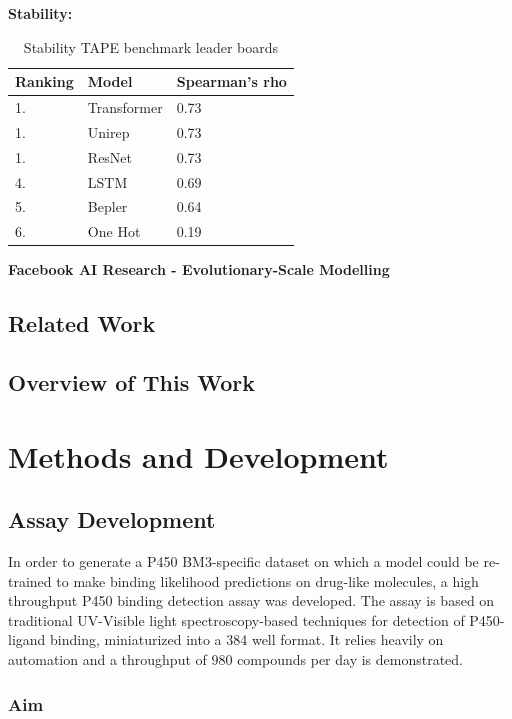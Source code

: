 \documentclass{article}
\begin{document}
\textbf{Stability:}

\begin{table}
	\begin{center}
		\caption{\label{tapestab} Stability TAPE benchmark leader boards }
		\begin{tabular}{l|p{3cm}|l}
			\textbf{Ranking} & \textbf{Model} & \textbf{Spearman's rho}\\
		\hline 
			 1. & Transformer & 0.73 \\
			 1. & Unirep & 0.73 \\
			 1. & ResNet & 0.73 \\
			 4. & LSTM & 0.69 \\
			 5. & Bepler & 0.64 \\
			 6. & One Hot & 0.19 \\
		\end{tabular}
	\end{center}
\end{table}

\textbf{Facebook AI Research - Evolutionary-Scale Modelling}
\subsection{Related Work}
\subsection{Overview of This Work}
\section{Methods and Development}
\subsection{Assay Development}

In order to generate a P450 BM3-specific dataset on which a model could be re-trained to make binding likelihood predictions on drug-like molecules, a high throughput P450 binding detection assay was developed.
The assay is based on traditional UV-Visible light spectroscopy-based techniques for detection of P450-ligand binding, miniaturized into a 384 well format. 
It relies heavily on automation and a throughput of 980 compounds per day is demonstrated.

\subsubsection{Aim}
\end{document}
